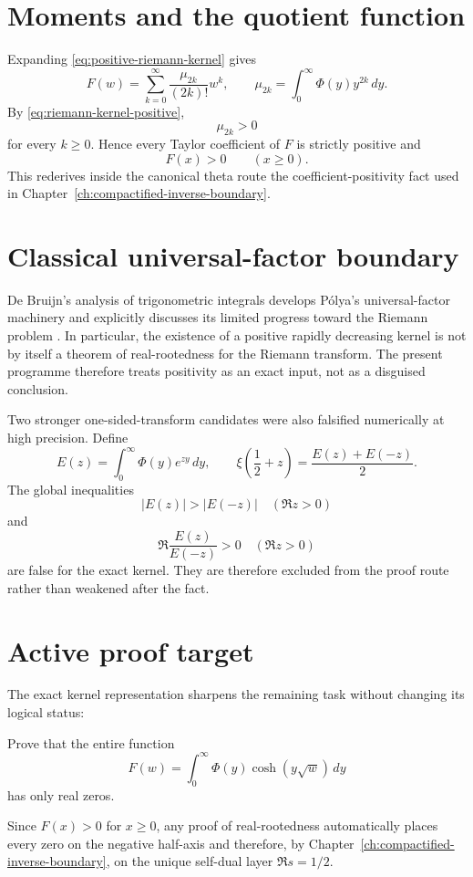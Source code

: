 \section{Moments and the quotient function}

Expanding \cref{eq:positive-riemann-kernel} gives
\[
 F(w)=\sum_{k=0}^{\infty}
 \frac{\mu_{2k}}{(2k)!}w^k,
 \qquad
 \mu_{2k}=\int_0^\infty \Phi(y)y^{2k}\,dy.
\]
By \cref{eq:riemann-kernel-positive},
\[
 \mu_{2k}>0
\]
for every $k\ge0$. Hence every Taylor coefficient of $F$ is strictly positive and
\[
 \boxed{F(x)>0\qquad(x\ge0).}
\]
This rederives inside the canonical theta route the coefficient-positivity fact used in Chapter~\ref{ch:compactified-inverse-boundary}.

\section{Classical universal-factor boundary}

De Bruijn's analysis of trigonometric integrals develops P\'olya's universal-factor machinery and explicitly discusses its limited progress toward the Riemann problem \citep{debruijn1950roots}. In particular, the existence of a positive rapidly decreasing kernel is not by itself a theorem of real-rootedness for the Riemann transform. The present programme therefore treats positivity as an exact input, not as a disguised conclusion.

Two stronger one-sided-transform candidates were also falsified numerically at high precision. Define
\[
 E(z)=\int_0^\infty\Phi(y)e^{zy}\,dy,
 \qquad
 \xi\!\left(\frac12+z\right)=\frac{E(z)+E(-z)}2.
\]
The global inequalities
\[
 |E(z)|>|E(-z)|\quad(\Re z>0)
\]
and
\[
 \Re\frac{E(z)}{E(-z)}>0\quad(\Re z>0)
\]
are false for the exact kernel. They are therefore excluded from the proof route rather than weakened after the fact.

\section{Active proof target}

The exact kernel representation sharpens the remaining task without changing its logical status:
\begin{problem}
Prove that the entire function
\[
 F(w)=\int_0^\infty\Phi(y)\cosh(y\sqrt w)\,dy
\]
has only real zeros.
\end{problem}
Since $F(x)>0$ for $x\ge0$, any proof of real-rootedness automatically places every zero on the negative half-axis and therefore, by Chapter~\ref{ch:compactified-inverse-boundary}, on the unique self-dual layer $\Re s=1/2$.

